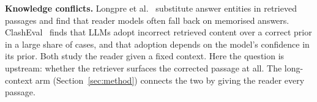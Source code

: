 \textbf{Knowledge conflicts.}
Longpre et al.~\cite{longpre2021entity} substitute answer entities in retrieved passages and find that reader models
often fall back on memorised answers. ClashEval~\cite{wu2024clasheval} finds that LLMs adopt incorrect retrieved content
over a correct prior in a large share of cases, and that adoption depends on the model's confidence in its prior. Both
study the reader given a fixed context. Here the question is upstream: whether the retriever surfaces the corrected
passage at all. The long-context arm (Section~\ref{sec:method}) connects the two by giving the reader every passage.
